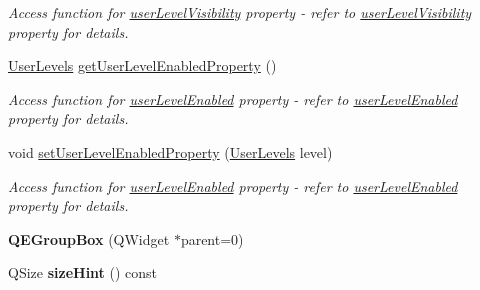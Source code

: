 \begin{DoxyCompactItemize}
\begin{DoxyCompactList}\small\item\em Access function for \hyperlink{classQEGroupBox_af592de1c93b6a919b9431c0dc3868dcc}{userLevelVisibility} property -\/ refer to \hyperlink{classQEGroupBox_af592de1c93b6a919b9431c0dc3868dcc}{userLevelVisibility} property for details. \end{DoxyCompactList}\item 
\hypertarget{classQEGroupBox_afb7c34703384e33cdebe0668ec2598fb}{
\hyperlink{classQEGroupBox_ad5a2c847226aa067c44f86ed42ddaba8}{UserLevels} \hyperlink{classQEGroupBox_afb7c34703384e33cdebe0668ec2598fb}{getUserLevelEnabledProperty} ()}
\label{classQEGroupBox_afb7c34703384e33cdebe0668ec2598fb}

\begin{DoxyCompactList}\small\item\em Access function for \hyperlink{classQEGroupBox_ad26f2a98dccecbdfbe200e3f032262fb}{userLevelEnabled} property -\/ refer to \hyperlink{classQEGroupBox_ad26f2a98dccecbdfbe200e3f032262fb}{userLevelEnabled} property for details. \end{DoxyCompactList}\item 
\hypertarget{classQEGroupBox_aaad9aec1cb3d889696495d0a46a9838e}{
void \hyperlink{classQEGroupBox_aaad9aec1cb3d889696495d0a46a9838e}{setUserLevelEnabledProperty} (\hyperlink{classQEGroupBox_ad5a2c847226aa067c44f86ed42ddaba8}{UserLevels} level)}
\label{classQEGroupBox_aaad9aec1cb3d889696495d0a46a9838e}

\begin{DoxyCompactList}\small\item\em Access function for \hyperlink{classQEGroupBox_ad26f2a98dccecbdfbe200e3f032262fb}{userLevelEnabled} property -\/ refer to \hyperlink{classQEGroupBox_ad26f2a98dccecbdfbe200e3f032262fb}{userLevelEnabled} property for details. \end{DoxyCompactList}\item 
\hypertarget{classQEGroupBox_ab859db65dcf651db87f9f42479cb16c5}{
{\bfseries QEGroupBox} (QWidget $\ast$parent=0)}
\label{classQEGroupBox_ab859db65dcf651db87f9f42479cb16c5}

\item 
\hypertarget{classQEGroupBox_ab4c7f8cb36d7538ab554396db1861505}{
QSize {\bfseries sizeHint} () const }
\label{classQEGroupBox_ab4c7f8cb36d7538ab554396db1861505}

\end{DoxyCompactItemize}
